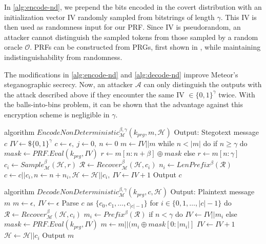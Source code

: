 In \autoref{alg:encode-nd}, we prepend the bits encoded in the covert distribution with an initialization vector IV randomly sampled from bitstrings of length $\gamma$.
This IV is then used as randomness input for our PRF.
Since IV is pseudorandom, an attacker cannot distinguish the sampled tokens from those sampled by a random oracle $\mathcal{O}$.
PRFs can be constructed from PRGs, first shown in \cite{PRF1986}, while maintaining indistinguishability from randomness.

The modifications in \autoref{alg:encode-nd} and \autoref{alg:decode-nd} improve Meteor's steganographic secrecy.
Now, an attacker $\mathcal{A}$ can only distinguish the outputs with the attack described above if they encounter the same IV $\in \{ 0,1\}^\gamma$ twice.
With the balls-into-bins problem, it can be shown that the advantage against this encryption scheme is negligible in $\gamma$.
\begin{Pseudocode}[float, caption={
Meteor EncodeNonDeterministic Algorithm.
This algorithm differs from the original Encode algorithm by sampling a random IV before encoding.
That IV is later used as randomness in a PRF used to generated the random masked.
The IV is incremented after each iteration of the encoding process.
The first $\gamma$ bits of the hiddentext are the IV. 
The introduction of an IV does not negatively affect secrecy, since IV is indistinguishable from randomness.}, label={alg:encode-nd}]
algorithm $EncodeNonDeterministic_{\mathcal{M}}^{\beta,\gamma}(k_{prg}, m, \mathcal{H})$
	Output: Stegotext message $c$
	$IV \leftarrow\$ \{0,1\}^\gamma$
	$c \leftarrow \epsilon,~ j \leftarrow 0,~ n \leftarrow 0$
	$m \leftarrow IV || m$
	while $n < |m|$ do
		if $n \geq \gamma$ do
			$mask \leftarrow PRF.Eval(k_{prg}, IV)$
			$r \leftarrow m[n:n+\beta] \oplus mask$
		else
			$r \leftarrow m[n:\gamma]$
		$c_i \leftarrow Sample_{\mathcal{M}}^\beta(\mathcal{H}, r)$
		$\mathcal{R} \leftarrow Recover_{\mathcal{M}}^\beta(\mathcal{H}, c_i)$
		$n_i \leftarrow LenPrefix^\beta(\mathcal{R})$
		$c \leftarrow c || c_i, n \leftarrow n+n_i, \mathcal{H} \leftarrow \mathcal{H}||c_i,~ IV \leftarrow IV+1$
	Output $c$
\end{Pseudocode}
\begin{Pseudocode}[float, caption={
Meteor DecodeNonDeterministic Algorithm.
This algorithm differs from the original Decode algorithm by interpreting the first $\gamma$ bits of the hiddentext as IV.
After decoding $\gamma$ bits of hiddentext, a PRF is initialized with IV for generation of pseudorandom masks.}, label={alg:decode-nd}]
algorithm $DecodeNonDeterministic_{\mathcal{M}}^{\beta,\gamma}(k_{prg}, c, \mathcal{H})$
	Output: Plaintext message $m$
	$m \leftarrow \epsilon,~ IV \leftarrow \epsilon$
	Parse $c$ as $\{ c_0, c_1, \dots, c_{|c|-1} \}$
	for $i \in \{0, 1, \dots, |c|-1 \}$ do
		$\mathcal{R} \leftarrow Recover_{\mathcal{M}}^\beta(\mathcal{H}, c_i)$
		$m_i \leftarrow Prefix^\beta(\mathcal{R})$
		if $n < \gamma$ do
			$IV \leftarrow IV || m_i$
		else
			$mask \leftarrow PRF.Eval(k_{prg}, IV)$
			$m \leftarrow m || (m_i \oplus mask[0: |m_i|]$
			$IV \leftarrow IV + 1$
		$\mathcal{H} \leftarrow \mathcal{H}||c_i$
	Output $m$
\end{Pseudocode}